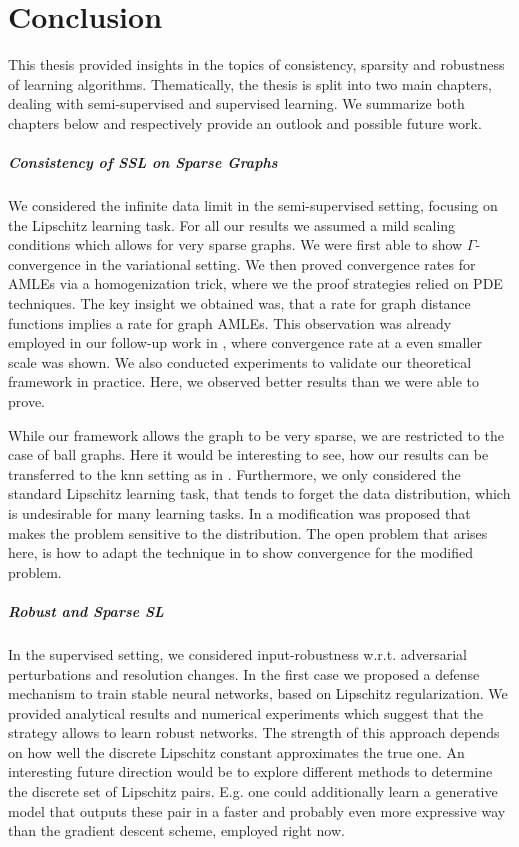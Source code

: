 \chapter{Conclusion}\label{ch:C}
%
%
This thesis provided insights in the topics of consistency, sparsity and robustness of learning algorithms. Thematically, the thesis is split into two main chapters, dealing with semi-supervised and supervised learning. We summarize both chapters below and respectively provide an outlook and possible future work.

\paragraph{Consistency of SSL on Sparse Graphs} We considered the infinite data limit in the semi-supervised setting, focusing on the Lipschitz learning task. For all our results we assumed a mild scaling conditions which allows for very sparse graphs. We were first able to show $\Gamma$-convergence in the variational setting. We then proved convergence rates for AMLEs via a homogenization trick, where we the proof strategies relied on PDE techniques. The key insight we obtained was, that a rate for graph distance functions implies a rate for graph AMLEs. This observation was already employed in our follow-up work in \cite{bungert2022ratio}, where convergence rate at a even smaller scale was shown. We also conducted experiments to validate our theoretical framework in practice. Here, we observed better results than we were able to prove. 

While our framework allows the graph to be very sparse, we are restricted to the case of ball graphs. Here it would be interesting to see, how our results can be transferred to the knn setting as in \cite{calder2022improved}. Furthermore, we only considered the standard Lipschitz learning task, that tends to forget the data distribution, which is undesirable for many learning tasks. In \cite{calder2019consistency} a modification was proposed that makes the problem sensitive to the distribution. The open problem that arises here, is how to adapt the technique in \cite{bungert2021uniform} to show convergence for the modified problem.\par

\paragraph{Robust and Sparse SL} In the supervised setting, we considered input-robustness w.r.t. adversarial perturbations and resolution changes. In the first case we proposed a defense mechanism to train stable neural networks, based on Lipschitz regularization. We provided analytical results and numerical experiments which suggest that the strategy allows to learn robust networks. The strength of this approach depends on how well the discrete Lipschitz constant approximates the true one. An interesting future direction would be to explore different methods to determine the discrete set of Lipschitz pairs. E.g. one could additionally learn a generative model that outputs these pair in a faster and probably even more expressive way than the gradient descent scheme, employed right now.


